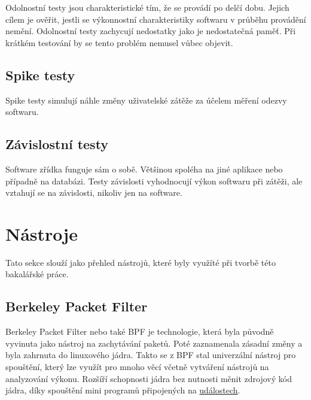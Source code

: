 Odolnostní testy jsou charakteristické tím, že se provádí po delčí dobu. Jejich cílem je ověřit, jestli se výkonnostní charakteristiky softwaru v průběhu provádění nemění. Odolnostní testy
zachycují nedostatky jako je nedostatečná paměť. Při krátkém testování by se tento problém nemusel vůbec objevit.

\subsection*{Spike testy}

Spike testy simulují náhle změny uživatelské zátěže za účelem měření odezvy softwaru.

\subsection*{Závislostní testy}

Software zřídka funguje sám o sobě. Většinou spoléha na jiné aplikace nebo případně na databázi. Testy závislosti vyhodnocují výkon softwaru při zátěži, ale vztahují se na závislosti, nikoliv
jen na software.

\section{Nástroje}

Tato sekce slouží jako přehled nástrojů, které byly využíté při tvorbě této bakalářské práce.

\subsection{Berkeley Packet Filter}
\label{sec:BPF}

Berkeley Packet Filter\cite{BPFPerformanceTools} nebo také BPF je technologie, která byla původně vyvinuta jako nástroj na zachytávání paketů. Poté zaznamenala zásadní změny a byla zahrnuta do linuxového jádra. Takto se z BPF stal univerzální nástroj pro spouštění, který lze využít pro mnoho věcí včetně vytváření nástrojů na analyzování výkonu.
Rozšíří schopnosti jádra bez nutnosti měnit zdrojový kód jádra, díky spouštění mini programů připojených na \hyperref[sec:SledovaniUdalosti]{událostech}.

